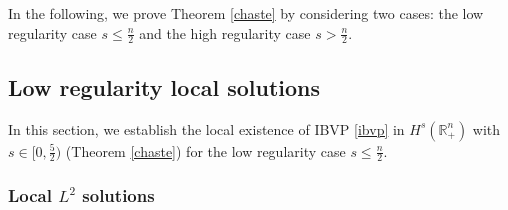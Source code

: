 \documentclass[preprint,compress,12pt]{elsarticle}
\numberwithin{equation}{section}
\begin{document}
In the following, we prove Theorem \ref{chaste}  by considering two cases: the low regularity case $s\leq\frac{n}{2}$ and the high regularity case $s>\frac{n}{2}$.


\subsection{Low regularity local solutions}
In this section, we establish the local existence of IBVP \eqref{ibvp} in $H^{s}(\mathbb{R}^{n}_{+})$ with   $s\in[0,\frac{5}{2})$ (Theorem \ref{chaste})  for the low regularity case  $s\leq \frac{n}{2}$.


\subsubsection{Local $L^{2}$ solutions}\label{65}
\end{document}
